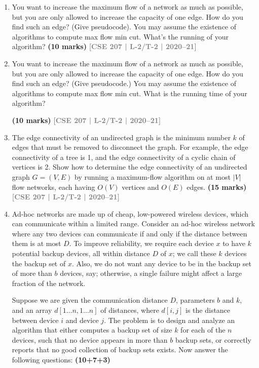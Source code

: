 \documentclass[12pt,a3paper]{article}
\newcommand{\yr}[1]{\hfill\textcolor{gray}{\small\textbf{[#1]}}}
\newcommand{\mk}[1]{\textcolor{orange!70!black}{\small\textbf{(#1 marks)}}}
\begin{document}
\begin{enumerate}
\begin{enumerate}
\item \textbf{[Car parking matching problem]} Develop an efficient solution of the above problem to find a match for every car so that the overall cost is minimized.
\mk{15} \yr{CSE 207 | L-2/T-2 | 2021--22}
\end{enumerate}

\item You want to increase the maximum flow of a network as much as possible, but you are only allowed to increase the capacity of one edge. How do you find such an edge? (Give pseudocode). You may assume the existence of algorithms to compute max flow min cut. What's the running of your algorithm?
\mk{10} \yr{CSE 207 | L-2/T-2 | 2020--21}

\item You want to increase the maximum flow of a network as much as possible, but you are only allowed to increase the capacity of one edge. How do you find such an edge? (Give pseudocode.) You may assume the existence of algorithms to compute max flow min cut. What is the running time of your algorithm?
 
\mk{10} \yr{CSE 207 | L-2/T-2 | 2020--21}

\item The edge connectivity of an undirected graph is the minimum number $k$ of edges that must be removed to disconnect the graph. For example, the edge connectivity of a tree is 1, and the edge connectivity of a cyclic chain of vertices is 2. Show how to determine the edge connectivity of an undirected graph $G = (V, E)$ by running a maximum-flow algorithm on at most $|V|$ flow networks, each having $O(V)$ vertices and $O(E)$ edges.
\mk{15} \yr{CSE 207 | L-2/T-2 | 2020--21}

\item Ad-hoc networks are made up of cheap, low-powered wireless devices, which can communicate within a limited range. Consider an ad-hoc wireless network where any two devices can communicate if and only if the distance between them is at most $D$. To improve reliability, we require each device $x$ to have $k$ potential backup devices, all within distance $D$ of $x$; we call these $k$ devices the backup set of $x$. Also, we do not want any device to be in the backup set of more than $b$ devices, say; otherwise, a single failure might affect a large fraction of the network.

\medskip

\noindent Suppose we are given the communication distance $D$, parameters $b$ and $k$, and an array $d[1 \dots n, 1 \dots n]$ of distances, where $d[i, j]$ is the distance between device $i$ and device $j$. The problem is to design and analyze an algorithm that either computes a backup set of size $k$ for each of the $n$ devices, such that no device appears in more than $b$ backup sets, or correctly reports that no good collection of backup sets exists. Now answer the following questions: \textbf{(10+7+3)}


\end{enumerate}
\end{document}
